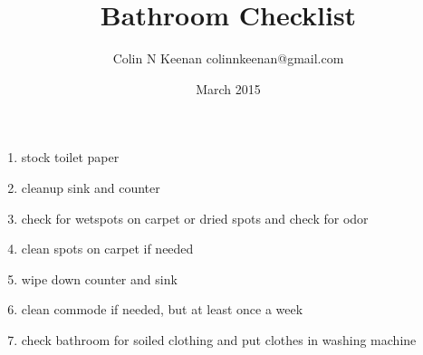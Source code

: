 \documentclass[12pt,letterpaper]{article}
\newcommand{\chorestitle}{Bathroom Checklist}
\begin{document}
\title{\chorestitle{}}
\author{Colin N Keenan colinnkeenan@gmail.com}
\date{March 2015}
\thispagestyle{fancy}
\begin{enumerate}
	\item stock toilet paper
	\item cleanup sink and counter
	\item check for wetspots on carpet or dried spots and check for odor
	\item clean spots on carpet if needed
	\item wipe down counter and sink
	\item clean commode if needed, but at least once a week
	\item check bathroom for soiled clothing and put clothes in washing machine
\end{enumerate}
\end{document}
